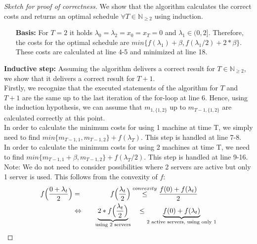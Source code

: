 \documentclass[hidelinks]{article}
\theoremstyle{plain}
\theoremstyle{definition}
\theoremstyle{rem}
\begin{document}
\begin{sloppypar}
\begin{proof}[Sketch for proof of correctness]
We show that the algorithm calculates the correct costs and returns an optimal schedule $\forall T\in\mathbb{N}_{\ge 2}$ using induction.
\begin{enumerate}
\item[\textbf{Basis:}] For $T=2$ it holds $\lambda_0=\lambda_2=x_0=x_T=0$ and $\lambda_1\in(0,2]$. Therefore, the costs for the optimal schedule are $min\bigl\{f(\lambda_1)+\beta, f(\lambda_1/2)+2*\beta\bigr\}$. These costs are calculated at line 4-5 and minimized at line 18.\end{enumerate}
\item[\textbf{Inductive step:}] Assuming the algorithm delivers a correct result for $T\in\mathbb{N}_{\ge 2}$, we show that it delivers a correct result for $T+1$.\\
Firstly, we recognize that the executed statements of the algorithm for $T$ and $T+1$ are the same up to the last iteration of the for-loop at line 6. Hence, using the induction hypothesis, we can assume that $m_{1,\{1,2\}}$ up to $m_{T-1,\{1,2\}}$ are calculated correctly at this point.\\
In order to calculate the minimum costs for using 1 machine at time T, we simply need to find $min\bigl\{m_{T-1,1},m_{T-1,2}\bigr\}+f(\lambda_T)$. This step is handled at line 7-8.\\
In order to calculate the minimum costs for using 2 machines at time T, we need to find $min\bigl\{m_{T-1,1}+\beta,m_{T-1,2}\bigr\}+f(\lambda_T/2)$. This step is handled at line 9-16.\\
Note: We do not need to consider possibilities where 2 servers are active but only 1 server is used. This follows from the convexity of $f$:
    \begin{alignat*}{5}
        f\Bigl(\frac{0+\lambda_t}{2}\Bigr)&=&f\Bigl(\frac{\lambda_t}{2}\Bigr)&\stackrel{convexity}{\le}\frac{f(0)+f(\lambda_t)}{2}\\
        &\Leftrightarrow\quad&\underbrace{2*f\Bigl(\frac{\lambda_t}{2}\Bigr)}_{\text{using 2 servers}}&\quad\le\underbrace{f(0)+f(\lambda_t)}_{\text{2 active servers, using only 1}}
    \end{alignat*}
\end{proof}
\end{sloppypar}
\end{document}
